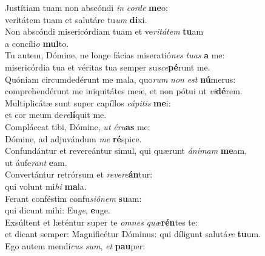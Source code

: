 \oddverse Justítiam tuam non abscóndi \textit{in} \textit{cor}\textit{de} \textbf{me}o:~\*\\
\oddverse veritátem tuam et salutáre tu\textit{um} \textbf{di}xi.\\
\evenverse Non abscóndi misericórdiam tuam et ve\textit{ri}\textit{tá}\textit{tem} \textbf{tu}am~\*\\
\evenverse a concíli\textit{o} \textbf{mul}to.\\
\oddverse Tu autem, Dómine, ne longe fácias miseratió\textit{nes} \textit{tu}\textit{as} \textbf{a} me:~\*\\
\oddverse misericórdia tua et véritas tua semper su\textit{sce}\textbf{pé}runt me.\\
\evenverse Quóniam circumdedérunt me mala, quo\textit{rum} \textit{non} \textit{est} \textbf{nú}merus:~\*\\
\evenverse comprehendérunt me iniquitátes meæ, et non pótui ut \textit{vi}\textbf{dé}rem.\\
\oddverse Multiplicátæ sunt super capíllos \textit{cá}\textit{pi}\textit{tis} \textbf{me}i:~\*\\
\oddverse et cor meum de\textit{re}\textbf{lí}quit me.\\
\evenverse Compláceat tibi, Dómine, \textit{ut} \textit{é}\textit{ru}\textbf{as} me:~\*\\
\evenverse Dómine, ad adjuvándum \textit{me} \textbf{ré}spice.\\
\oddverse Confundántur et revereántur simul, qui quærunt \textit{á}\textit{ni}\textit{mam} \textbf{me}am,~\*\\
\oddverse ut áufe\textit{rant} \textbf{e}am.\\
\evenverse Convertántur retrórsum et \textit{re}\textit{ve}\textit{re}\textbf{án}tur:~\*\\
\evenverse qui volunt mi\textit{hi} \textbf{ma}la.\\
\oddverse Ferant conféstim confu\textit{si}\textit{ó}\textit{nem} \textbf{su}am:~\*\\
\oddverse qui dicunt mihi: Eu\textit{ge}, \textbf{e}uge.\\
\evenverse Exsúltent et læténtur super te \textit{om}\textit{nes} \textit{quæ}\textbf{rén}tes te:~\*\\
\evenverse et dicant semper: Magnificétur Dóminus: qui díligunt salutá\textit{re} \textbf{tu}um.\\
\oddverse Ego autem mendí\textit{cus} \textit{sum}, \textit{et} \textbf{pau}per:~\*\\
